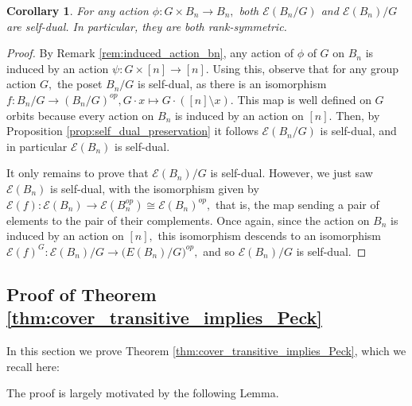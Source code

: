 \documentclass[10 pt]{amsart}
\theoremstyle{plain}
\newtheorem{cor}[thm]{Corollary}
\theoremstyle{definition}
\theoremstyle{remark}
\numberwithin{equation}{section}
\newcommand\ssec{\subsection}
\begin{document}
\begin{cor}
For any action $\phi:G \times B_n \rightarrow B_n,$ both $\mathcal E(B_n/G)$ and $\mathcal E(B_n)/G$ are self-dual. In particular, they are both rank-symmetric. 
\end{cor}
\begin{proof}
By Remark \ref{rem:induced_action_bn}, any action of $\phi$ of $G$ on $B_n$ is induced by an action $\psi:G \times [n] \rightarrow [n].$ Using this, observe that for any group action $G,$ the poset $B_n/G$ is self-dual, as there is an isomorphism $f:B_n/G \rightarrow (B_n/G)^{op},G \cdot x \mapsto G \cdot ([n] \setminus x).$ This map is well defined on $G$ orbits because every action on $B_n$ is induced by an action on $[n].$ Then, by Proposition \ref{prop:self_dual_preservation} it follows $\mathcal E(B_n/G)$ is self-dual, and in particular $\mathcal E(B_n)$ is self-dual.

It only remains to prove that $\mathcal E(B_n)/G$ is self-dual. However, we just saw $\mathcal E(B_n)$ is self-dual, with the isomorphism given by $\mathcal E(f):\mathcal E(B_n) \rightarrow \mathcal E(B_n^{op})\cong \mathcal E(B_n)^{op},$ that is, the map sending a pair of elements to the pair of their complements. Once again, since the action on $B_n$ is induced by an action on $[n],$ this isomorphism descends to an isomorphism $\mathcal E(f)^G:\mathcal E(B_n)/G \rightarrow \mathcal (E(B_n)/G)^{op},$ and so $\mathcal E(B_n)/G$ is self-dual.
\end{proof}


\ssec{Proof of Theorem \ref{thm:cover_transitive_implies_Peck}}\label{ssec:proof_of_cover_transitive_implies_Peck}

In this section we prove Theorem \ref{thm:cover_transitive_implies_Peck}, which we recall here:

\cctpeck*

The proof is largely motivated by the following Lemma.
\end{document}
